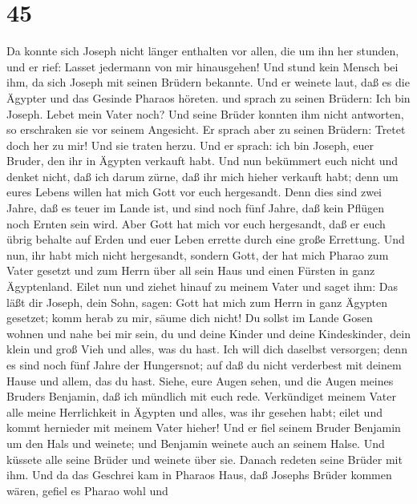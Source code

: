 \hypertarget{section-44}{%
\section{45}\label{section-44}}

 Da konnte sich Joseph nicht länger enthalten vor allen, die
um ihn her stunden, und er rief: Lasset jedermann von mir hinausgehen!
Und stund kein Mensch bei ihm, da sich Joseph mit seinen Brüdern
bekannte.  Und er weinete laut, daß es die Ägypter und das
Gesinde Pharaos höreten.  und sprach zu seinen Brüdern: Ich
bin Joseph. Lebet mein Vater noch? Und seine Brüder konnten ihm nicht
antworten, so erschraken sie vor seinem Angesicht.  Er
sprach aber zu seinen Brüdern: Tretet doch her zu mir! Und sie traten
herzu. Und er sprach: ich bin Joseph, euer Bruder, den ihr in Ägypten
verkauft habt.  Und nun bekümmert euch nicht und denket
nicht, daß ich darum zürne, daß ihr mich hieher verkauft habt; denn um
eures Lebens willen hat mich Gott vor euch hergesandt.  Denn
dies sind zwei Jahre, daß es teuer im Lande ist, und sind noch fünf
Jahre, daß kein Pflügen noch Ernten sein wird.  Aber Gott
hat mich vor euch hergesandt, daß er euch übrig behalte auf Erden und
euer Leben errette durch eine große Errettung.  Und nun, ihr
habt mich nicht hergesandt, sondern Gott, der hat mich Pharao zum Vater
gesetzt und zum Herrn über all sein Haus und einen Fürsten in ganz
Ägyptenland.  Eilet nun und ziehet hinauf zu meinem Vater
und saget ihm: Das läßt dir Joseph, dein Sohn, sagen: Gott hat mich zum
Herrn in ganz Ägypten gesetzet; komm herab zu mir, säume dich nicht!
 Du sollst im Lande Gosen wohnen und nahe bei mir sein, du
und deine Kinder und deine Kindeskinder, dein klein und groß Vieh und
alles, was du hast.  Ich will dich daselbst versorgen; denn
es sind noch fünf Jahre der Hungersnot; auf daß du nicht verderbest mit
deinem Hause und allem, das du hast.  Siehe, eure Augen
sehen, und die Augen meines Bruders Benjamin, daß ich mündlich mit euch
rede.  Verkündiget meinem Vater alle meine Herrlichkeit in
Ägypten und alles, was ihr gesehen habt; eilet und kommt hernieder mit
meinem Vater hieher!  Und er fiel seinem Bruder Benjamin um
den Hals und weinete; und Benjamin weinete auch an seinem Halse.
 Und küssete alle seine Brüder und weinete über sie. Danach
redeten seine Brüder mit ihm.  Und da das Geschrei kam in
Pharaos Haus, daß Josephs Brüder kommen wären, gefiel es Pharao wohl und
